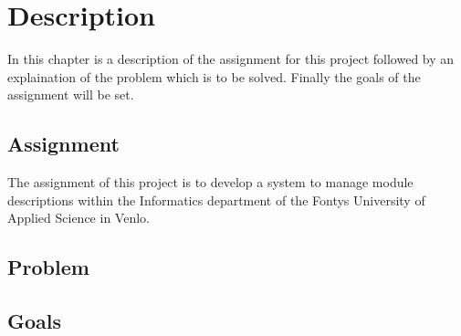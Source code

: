 \chapter{Description}
In this chapter is a description of the assignment for this project followed by an explaination 
of the problem which is to be solved. Finally the goals of the assignment will be set.

\section{Assignment}
The assignment of this project is to develop a system to manage module descriptions within the Informatics
department of the Fontys University of Applied Science in Venlo. 

\section{Problem}


\section{Goals}